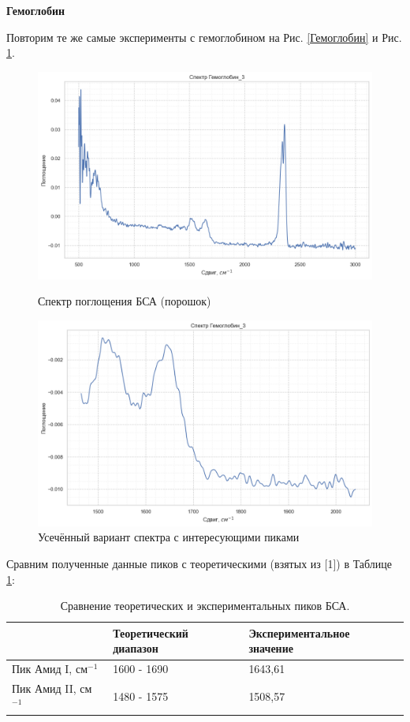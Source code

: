 \documentclass{article}
\begin{document}
\textbf{Гемоглобин}

Повторим те же самые эксперименты с гемоглобином на Рис. \ref{Гемоглобин} и Рис. \ref{Гемоглобин усечённое}. 

\begin{figure}[h!] 
        \centering
        \centering
            \includegraphics[width=0.9\linewidth]{Images/Гемоглобин.png}
                 \caption{Спектр поглощения БСА (порошок)}
                 \label{Гемоглобин}
        \endminipage\hfill
        \centering
             \includegraphics[width=0.9\linewidth]{Images/Гемоглобин усечённое.png}
                 \caption{Усечённый вариант спектра с интересующими пиками}
                 \label{Гемоглобин усечённое}
        \endminipage
\end{figure}

Сравним полученные данные пиков с теоретическими (взятых из [1]) в Таблице \ref{Гемоглобин_табл}:

\begin{table}[h!]
\centering
\caption{Сравнение теоретических и экспериментальных пиков БСА.}
\begin{tabular}{|l|l|l|}
\hline
 & Теоретический диапазон & Экспериментальное значение \\ \hline
Пик Амид I, см$^{-1}$ & 1600 - 1690 & 1643,61 \\ \hline
Пик Амид II, см$^{-1}$& 1480 - 1575 & 1508,57 \\ \hline
\end{tabular}
\label{Гемоглобин_табл}
\end{table}
\end{document}
